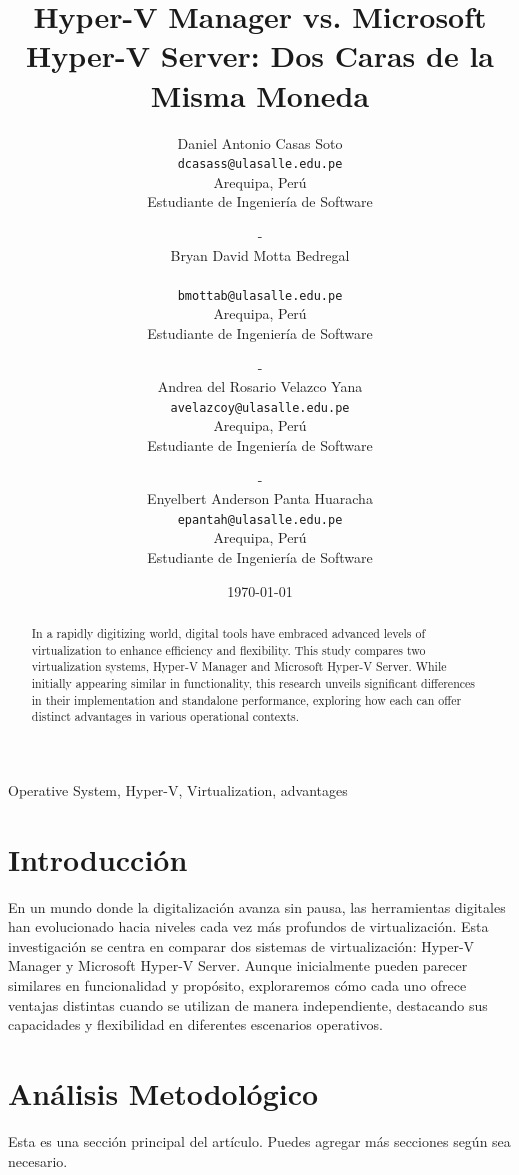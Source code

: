 \documentclass[journal]{IEEEtran}
\title{\textbf{Hyper-V Manager vs. Microsoft Hyper-V Server: Dos Caras de la Misma Moneda}}
\author{
  Daniel Antonio Casas Soto \\
  \texttt{dcasass@ulasalle.edu.pe} \\
  Arequipa, Perú \\
  Estudiante de Ingeniería de Software \\
  \and - \\
  Bryan David Motta Bedregal \\\\
  \texttt{bmottab@ulasalle.edu.pe} \\
  Arequipa, Perú \\
  Estudiante de Ingeniería de Software \\
  \and - \\
  Andrea del Rosario Velazco Yana \\
  \texttt{avelazcoy@ulasalle.edu.pe} \\
  Arequipa, Perú \\
  Estudiante de Ingeniería de Software \\
  \and - \\
  Enyelbert Anderson Panta Huaracha \\
  \texttt{epantah@ulasalle.edu.pe} \\
  Arequipa, Perú \\
  Estudiante de Ingeniería de Software
}
\date{\today}
\begin{document}
\maketitle

\begin{abstract}
In a rapidly digitizing world, digital tools have embraced advanced levels of virtualization to enhance efficiency and flexibility. This study compares two virtualization systems, Hyper-V Manager and Microsoft Hyper-V Server. While initially appearing similar in functionality, this research unveils significant differences in their implementation and standalone performance, exploring how each can offer distinct advantages in various operational contexts.
\end{abstract}

\begin{IEEEkeywords}
Operative System, Hyper-V, Virtualization, advantages
\end{IEEEkeywords}

\section{Introducción}
En un mundo donde la digitalización avanza sin pausa, las herramientas digitales han evolucionado hacia niveles cada vez más profundos de virtualización. Esta investigación se centra en comparar dos sistemas de virtualización: Hyper-V Manager y Microsoft Hyper-V Server. Aunque inicialmente pueden parecer similares en funcionalidad y propósito, exploraremos cómo cada uno ofrece ventajas distintas cuando se utilizan de manera independiente, destacando sus capacidades y flexibilidad en diferentes escenarios operativos.

\section{Análisis Metodológico}
Esta es una sección principal del artículo. Puedes agregar más secciones según sea necesario.
\end{document}
